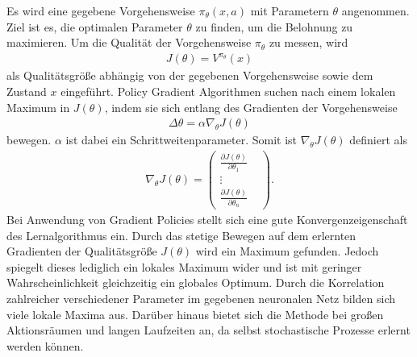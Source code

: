 		Es wird eine gegebene Vorgehensweise $\pi_\theta(x,a)$ mit Parametern $\theta$ angenommen. Ziel ist es, die optimalen Parameter $\theta$ zu finden, um die Belohnung zu maximieren. Um die Qualität der Vorgehensweise $\pi_\theta$ zu messen, wird
		\begin{align}
			J(\theta) = V^{\pi_\theta}(x)
		\end{align}
		als Qualitätsgröße abhängig von der gegebenen Vorgehensweise sowie dem Zustand $x$ eingeführt. Policy Gradient Algorithmen suchen nach einem lokalen Maximum in $J(\theta)$, indem sie sich entlang des Gradienten der Vorgehensweise 
		\begin{align}
			\Delta \theta = \alpha \nabla_\theta J(\theta)
		\end{align}
		bewegen. $\alpha$ ist dabei ein Schrittweitenparameter.	Somit ist $\nabla_\theta J(\theta)$ definiert als
		\begin{align}
			\nabla_\theta J(\theta) = \begin{pmatrix}
			\frac{\partial J(\theta)}{\partial \theta_1} & \\
			\vdots & \\
			\frac{\partial J(\theta)}{\partial \theta_n} & \end{pmatrix}.
		\end{align}
		Bei Anwendung von Gradient Policies stellt sich eine gute Konvergenzeigenschaft des Lernalgorithmus ein. Durch das stetige Bewegen auf dem erlernten Gradienten der Qualitätsgröße $J(\theta)$ wird ein Maximum gefunden. Jedoch spiegelt dieses lediglich ein lokales Maximum wider und ist mit geringer Wahrscheinlichkeit gleichzeitig ein globales Optimum. Durch die Korrelation zahlreicher verschiedener Parameter im gegebenen neuronalen Netz bilden sich viele lokale Maxima aus. Darüber hinaus bietet sich die Methode bei großen Aktionsräumen und langen Laufzeiten an, da selbst stochastische Prozesse erlernt werden können. \cite{SilverRL} 
		
